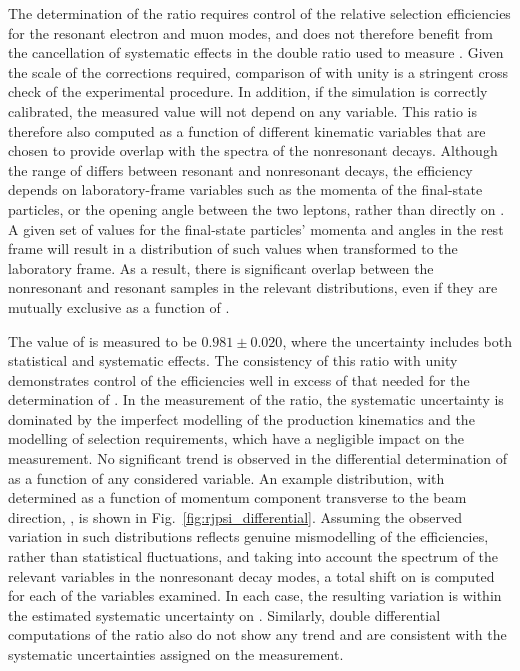 The determination of the \rjpsi ratio requires control of the relative selection efficiencies for the resonant electron and muon modes, and does not therefore benefit from the cancellation of systematic effects in the double ratio used to measure \RK. Given the scale of the corrections required, comparison of \rjpsi with unity is a stringent cross check of the experimental procedure. 
In addition, if the simulation is correctly calibrated, the measured \rjpsi value will not depend on any variable.
This ratio is therefore also computed as a function of different kinematic variables that are chosen to provide overlap with the spectra of the nonresonant decays. Although the range of \qsq differs between resonant and nonresonant decays, the efficiency depends on laboratory-frame variables such as the momenta of the final-state particles, or the opening angle between the two leptons, rather than directly on \qsq. A given set of values for the final-state particles' momenta and angles in the \Bp rest frame will result in a distribution of such values when transformed to the laboratory frame. As a result, there is significant overlap between the nonresonant and resonant samples in the relevant distributions, even if they are mutually exclusive as a function of \qsq. 

The value of \rjpsi is measured to be $0.981\pm0.020$, where the uncertainty includes both statistical and systematic effects.
The consistency of this ratio with unity demonstrates control of the efficiencies well in excess of that needed for the determination of \RK. 
In the measurement of the \rjpsi ratio, the systematic uncertainty is dominated by the imperfect modelling of the \Bu production kinematics and the modelling of selection requirements, which have a negligible impact on the \RK measurement.
No significant trend is observed in the differential determination of \rjpsi as a function of any considered variable. An example distribution, with \rjpsi determined as a function of \Bp momentum component transverse to the beam direction, \pt, is shown in Fig.~\ref{fig:rjpsi_differential}. Assuming the observed \rjpsi variation in such distributions reflects genuine mismodelling of the efficiencies, rather than statistical fluctuations, and taking into account the spectrum of the relevant variables in the nonresonant decay modes, a total shift on \RK is computed for each of the variables examined. In each case, the resulting variation is within the estimated systematic uncertainty on \RK. Similarly, double differential
computations of the \rjpsi ratio also do not show any trend and are consistent with the systematic uncertainties assigned on the \RK measurement.

